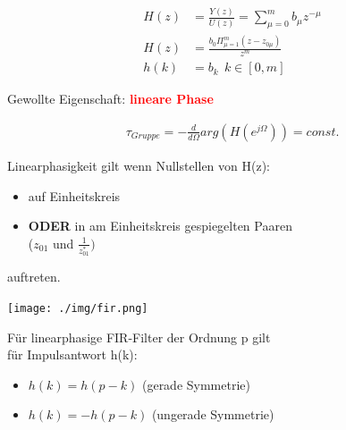 \documentclass[10pt,a4paper]{article}
\begin{document}
  \begin{mdframed}[style=exercise]
    \begin{align}
        H(z)&=\frac{Y(z)}{U(z)}= \sum_{\mu=0}^{m} b_\mu z^{-\mu} \\
        H(z)&=\frac{b_0\Pi_{\mu=1}^{m}(z-z_{0\mu})}{z^m}\\
        h(k)&= b_k \ \ k\in[0,m] 
    \end{align}
  \end{mdframed} 
\begin{minipage}{0.5\textwidth} 
Gewollte Eigenschaft: \textbf{\textcolor{red}{lineare Phase}}
  \begin{mdframed}[style=exercise]
    \begin{align}
        \tau_{Gruppe} = -\frac{d}{d\Omega} arg(H(e^{j\Omega})) = const.
    \end{align}
  \end{mdframed}
Linearphasigkeit gilt wenn Nullstellen von H(z):
\begin{itemize}
    \item auf Einheitskreis
    \item \textbf{ODER} in am Einheitskreis gespiegelten Paaren\\
    ($z_{01}$ und $\frac{1}{z^*_{01}})$
\end{itemize}
auftreten.
  \begin{center}
      \texttt{[image: ./img/fir.png]}
  \end{center}
Für linearphasige FIR-Filter der Ordnung p gilt\\
für Impulsantwort h(k):
\begin{itemize}
    \item $h(k)= h(p-k)$ (gerade Symmetrie) 
    \item $h(k)= -h(p-k)$ (ungerade Symmetrie)\\
\end{itemize}
\end{minipage}
\end{document}
